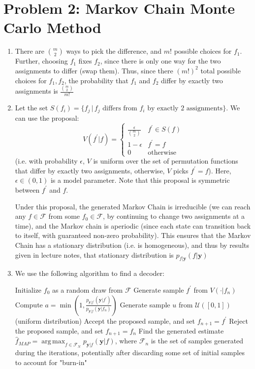 \documentclass[secnumaric,notitlepage,amsmath,amssymb,nofootinbib,floatfix,12pt]{revtex4-1}
\DeclareMathOperator*{\argmax}{arg\,max}
\begin{document}
\section*{Problem 2: Markov Chain Monte Carlo Method}
\begin{enumerate}[label=(\alph*)]
\item There are $\binom{m}{2}$ ways to pick the difference, and $m!$ possible choices for $f_1$. Further, choosing $f_1$ fixes $f_2$, since there is only one way for the two assignments to differ (swap them). Thus, since there $(m!)^2$ total possible choices for $f_1,f_2$, the probability that $f_1$ and $f_2$ differ by exactly two assignments is $\frac{\binom{m}{2}}{m!}$
\item Let the set $S(f_i) = \{ f_j \, | \, \text{$f_j$ differs from $f_i$ by exactly 2 assignments} \}$. We can use the proposal:
\[ V(f^{\prime} | f) = 
\begin{cases} 
      \frac{\epsilon}{\binom{m}{2}} & f^{\prime} \in S(f) \\
      1-\epsilon & f^{\prime}=f \\
      0 & \text{otherwise} 
   \end{cases}
\] (i.e. with probability $\epsilon$, $V$ is uniform over the set of permutation functions that differ by exactly two assignments, otherwise, $V$ picks $f^{\prime}=f$). Here, $\epsilon \in (0,1)$ is a model parameter. Note that this proposal is symmetric between $f^{\prime}$ and $f$. \par
Under this proposal, the generated Markov Chain is irreducible (we can reach any $f\in\mathcal{F}$ from some $f_0 \in \mathcal{F}$, by continuing to change two assignments at a time), and the Markov chain is aperiodic (since each state can transition back to itself, with guaranteed non-zero probability). This ensures that the Markov Chain has a stationary distribution (i.e. is homogeneous), and thus by results given in lecture notes, that stationary distribution is $p_{f|\mathbf{y}}(f|\mathbf{y})$
\item We use the following algorithm to find a decoder:
\begin{algorithmic}
\State Initialize $f_0$ as a random draw from $\mathcal{F}$
\Repeat {}
	\State Generate sample $f^{\prime}$ from $V(\cdot | f_n)$
	\State Compute $a = \min (1, \frac{p_{\mathbf{y}|f^{\prime}}(\mathbf{y}|f^{\prime})}{p_{\mathbf{y}|f}(\mathbf{y}|f_n)})$
	\State Generate sample $u$ from $\mathcal{U}([0,1])$ (uniform distribution)
		\State Accept the proposed sample, and set $f_{n+1} = f^{\prime}$
	\Else
		\State Reject the proposed sample, and set $f_{n+1} = f_n$
	\EndIf
{}
\State Find the generated estimate $\hat{f}_{MAP} = \argmax_{f \in \mathcal{F}_N} p_{\mathbf{y}|f}(\mathbf{y}|f)$, where $\mathcal{F}_n$ is the set of samples generated during the iterations, potentially after discarding some set of initial samples to account for "burn-in"
\end{algorithmic}
\end{enumerate}
\end{document}
